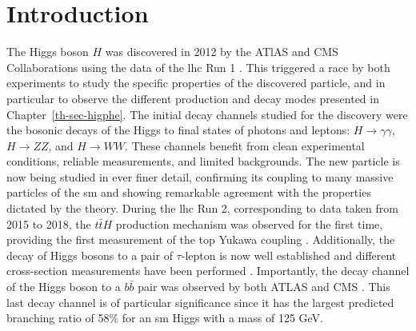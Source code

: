 \section{Introduction}
The Higgs boson $H$ \cite{Englert:1964et, PhysRevLett.13.508, Higgs:1964ia, PhysRevLett.13.585} was discovered in 2012 by the ATlAS and CMS Collaborations using the data of the \gls{lhc} Run 1 \cite{ATLAS:2012yve, CMS:2012qbp}. This triggered a race by both experiments to study the specific properties of the discovered particle, and in particular to observe the different production and decay modes presented in Chapter~\ref{th-sec-higphe}. The initial decay channels studied for the discovery were the bosonic decays of the Higgs to final states of photons and leptons: $H \rightarrow \gamma\gamma$, $H \rightarrow ZZ$, and $H \rightarrow WW$. These channels benefit from clean experimental conditions, reliable measurements, and limited backgrounds. The new particle is now being studied in ever finer detail, confirming its coupling to many massive particles of the \gls{sm} and showing remarkable agreement with the properties dictated by the theory. During the \gls{lhc} Run 2, corresponding to data taken from 2015 to 2018, the $t\bar{t}H$ production mechanism was observed for the first time, providing the first measurement of the top Yukawa coupling \cite{ATLAS:2018mme, CMS:2018uxb}. Additionally, the decay of Higgs bosons to a pair of $\tau$-lepton is now well established and different cross-section measurements have been performed \cite{atlasTauMeasu, CMS:2021gxc}. Importantly, the decay channel of the Higgs boson to a $b\bar{b}$ pair was observed by both ATLAS and CMS \cite{ATLAS:2018kot, CMS:2018nsn}. This last decay channel is of particular significance since it has the largest predicted branching ratio of 58\% for an \gls{sm} Higgs with a mass of 125 GeV. \\ 

